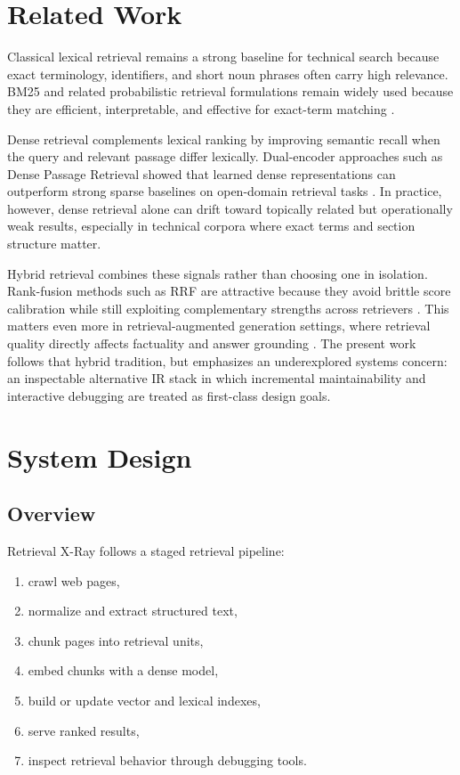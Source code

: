 \documentclass[conference]{IEEEtran}
\newcommand{\system}{Retrieval X-Ray\xspace}
\begin{document}
\section{Related Work}
Classical lexical retrieval remains a strong baseline for technical search because exact terminology, identifiers, and short noun phrases often carry high relevance. BM25 and related probabilistic retrieval formulations remain widely used because they are efficient, interpretable, and effective for exact-term matching \cite{robertson2009bm25}.

Dense retrieval complements lexical ranking by improving semantic recall when the query and relevant passage differ lexically. Dual-encoder approaches such as Dense Passage Retrieval showed that learned dense representations can outperform strong sparse baselines on open-domain retrieval tasks \cite{karpukhin2020dpr}. In practice, however, dense retrieval alone can drift toward topically related but operationally weak results, especially in technical corpora where exact terms and section structure matter.

Hybrid retrieval combines these signals rather than choosing one in isolation. Rank-fusion methods such as RRF are attractive because they avoid brittle score calibration while still exploiting complementary strengths across retrievers \cite{cormack2009rrf}. This matters even more in retrieval-augmented generation settings, where retrieval quality directly affects factuality and answer grounding \cite{lewis2020rag}. The present work follows that hybrid tradition, but emphasizes an underexplored systems concern: an inspectable alternative IR stack in which incremental maintainability and interactive debugging are treated as first-class design goals.

\section{System Design}
\subsection{Overview}
\system follows a staged retrieval pipeline:
\begin{enumerate}
    \item crawl web pages,
    \item normalize and extract structured text,
    \item chunk pages into retrieval units,
    \item embed chunks with a dense model,
    \item build or update vector and lexical indexes,
    \item serve ranked results,
    \item inspect retrieval behavior through debugging tools.
\end{enumerate}
\end{document}
